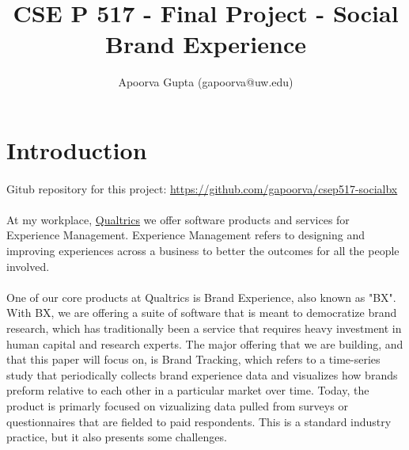 \documentclass{article}
\begin{document}
\title{CSE P 517 - Final Project - Social Brand Experience}
\author{ Apoorva Gupta (gapoorva@uw.edu)}

\maketitle{}

\section{Introduction}

\paragraph{} Gitub repository for this project: \href{https://github.com/gapoorva/csep517-socialbx}{https://github.com/gapoorva/csep517-socialbx}

\paragraph{} At my workplace, \href{http://www.qualtrics.com/brand-experience/}{Qualtrics} we offer software products and services for Experience Management. Experience Management refers to designing and improving experiences across a business to better the outcomes for all the people involved.

\paragraph{} One of our core products at Qualtrics is Brand Experience, also known as "BX". With BX, we are offering a suite of software that is meant to democratize brand research, which has traditionally been a service that requires heavy investment in human capital and research experts. The major offering that we are building, and that this paper will focus on, is Brand Tracking, which refers to a time-series study that periodically collects brand experience data and visualizes how brands preform relative to each other in a particular market over time. Today, the product is primarly focused on vizualizing data pulled from surveys or questionnaires that are fielded to paid respondents. This is a standard industry practice, but it also presents some challenges.
\end{document}
